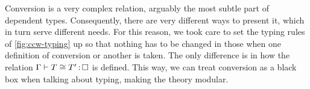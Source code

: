 \begin{figure*}[ht]
  \LastFloat


  \caption{Collected typing rules for }
  \label{fig:ccw-typing}
\end{figure*}

Conversion is a very complex relation, arguably the most subtle part of dependent types.
Consequently, there are very different ways to present it, which in turn serve different
needs.
For this reason, we took care to set the typing rules of
\cref{fig:ccw-typing} up so that nothing has to
be changed in those when one definition of conversion or another is taken. The only
difference is in how the relation $\Gamma \vdash T \conv T' \ty \uni$ is defined.
This way, we can treat conversion as a black box when talking about typing,
making the theory modular.


